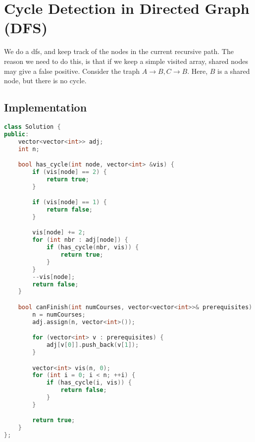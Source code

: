 \documentclass[12pt]{article}
\begin{document}
\section{Cycle Detection in Directed Graph (DFS)}
We do a dfs, and keep track of the nodes in the current recursive path. The reason we need to do this, is that if we keep a simple visited array, shared nodes may give a false positive. Consider the traph $A \rightarrow B, C \rightarrow B$. Here, $B$ is a shared node, but there is no cycle.

\subsection{Implementation}
\begin{lstlisting}[language=C++]
class Solution {
public:
    vector<vector<int>> adj;
    int n;

    bool has_cycle(int node, vector<int> &vis) {
        if (vis[node] == 2) {
            return true;
        }

        if (vis[node] == 1) {
            return false;
        }

        vis[node] += 2;
        for (int nbr : adj[node]) {
            if (has_cycle(nbr, vis)) {
                return true;
            }
        }
        --vis[node];
        return false;
    }

    bool canFinish(int numCourses, vector<vector<int>>& prerequisites) {
        n = numCourses;
        adj.assign(n, vector<int>());

        for (vector<int> v : prerequisites) {
            adj[v[0]].push_back(v[1]);
        }

        vector<int> vis(n, 0);
        for (int i = 0; i < n; ++i) {
            if (has_cycle(i, vis)) {
                return false;
            }
        }

        return true;
    }
};
\end{lstlisting}
\end{document}
